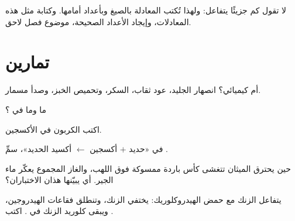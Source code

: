 \begin{remark}[عدّ الجزيئات]\label{rem:g7:chemical-reactions:counting}
لا تقول  كم جزيئًا يتفاعل: ولهذا تُكتب المعادلة بالصيغ
وبأعداد أمامها. وكتابة مثل هذه المعادلات، وإيجاد الأعداد الصحيحة، موضوع
فصل لاحق.
\end{remark}

\section{تمارين}

\begin{exercise}[$\star$]\label{exo:g7:chemical-reactions:1}
 أم كيميائي؟ انصهار الجليد،  عود ثقاب،  السكر،
وتحميص الخبز، وصدأ مسمار.
\end{exercise}

\begin{exercise}[$\star$]\label{exo:g7:chemical-reactions:2}
ما  وما  في ؟
\end{exercise}

\begin{exercise}[$\star$]\label{exo:g7:chemical-reactions:3}
اكتب   الكربون في الأكسجين.
\end{exercise}

\begin{exercise}[$\star$]\label{exo:g7:chemical-reactions:4}
في  «حديد $+$ أكسجين $\longleftarrow$ أكسيد الحديد»،
سمِّ  .
\end{exercise}

\begin{exercise}[$\star\star$]\label{exo:g7:chemical-reactions:5}
حين يحترق الميثان تتغشى كأس باردة ممسوكة فوق اللهب، والغاز المجموع يعكّر
ماء الجير. أي  يبيّنها هذان
الاختباران؟
\end{exercise}

\begin{exercise}[$\star\star$]\label{exo:g7:chemical-reactions:6}
يتفاعل الزنك مع حمض الهيدروكلوريك: يختفي الزنك، وتنطلق فقاعات
الهيدروجين، ويبقى كلوريد الزنك في . اكتب
.
\end{exercise}

